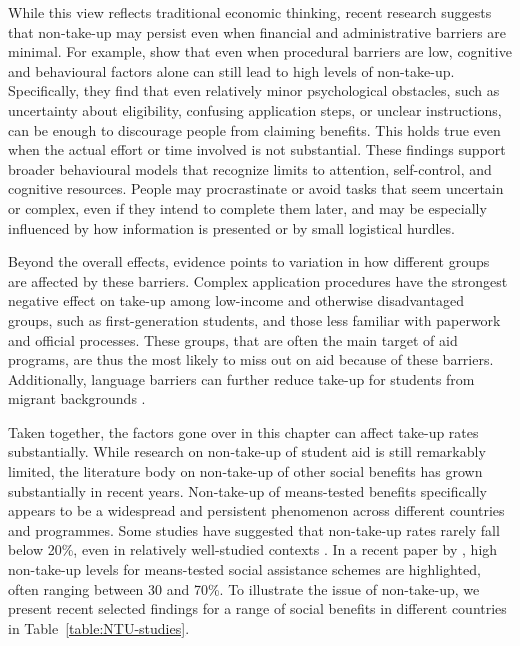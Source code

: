 While this view reflects traditional economic thinking, recent research suggests that non-take-up may persist even when financial and administrative barriers are minimal. 
For example, \cite{bhargava_psychological_2015} show that even when procedural barriers are low, cognitive and behavioural factors alone can still lead to high levels of non-take-up. 
Specifically, they find that even relatively minor psychological obstacles, such as uncertainty about eligibility, confusing application steps, or unclear instructions, can be enough to discourage people from claiming benefits. 
This holds true even when the actual effort or time involved is not substantial. 
These findings support broader behavioural models that recognize limits to attention, self-control, and cognitive resources. 
People may procrastinate or avoid tasks that seem uncertain or complex, even if they intend to complete them later, and may be especially influenced by how information is presented or by small logistical hurdles.

Beyond the overall effects, evidence points to variation in how different groups are affected by these barriers. Complex application procedures have the strongest negative effect on take-up among low-income and otherwise disadvantaged groups, such as first-generation students, and those less familiar with paperwork and official processes. These groups, that are often the main target of aid programs, are thus the most likely to miss out on aid because of these barriers. Additionally, language barriers can further reduce take-up for students from migrant backgrounds \citep{dynarski_cost_2006, bhargava_psychological_2015}.


Taken together, the factors gone over in this chapter can affect take-up rates substantially. While research on non-take-up of student aid is still remarkably limited, the literature body on non-take-up of other social benefits has grown substantially in recent years. Non-take-up of means-tested benefits specifically appears to be a widespread and persistent phenomenon across different countries and programmes. Some studies have suggested that non-take-up rates rarely fall below 20\%, even in relatively well-studied contexts \citep{vanoorschot_failing_2002}. In a recent paper by \cite{goedeme_concept_2020}, high non-take-up levels for means-tested social assistance schemes are highlighted, often ranging between 30 and 70\%. To illustrate the issue of non-take-up, we present recent selected findings for a range of social benefits in different countries in Table~\ref{table:NTU-studies}.


